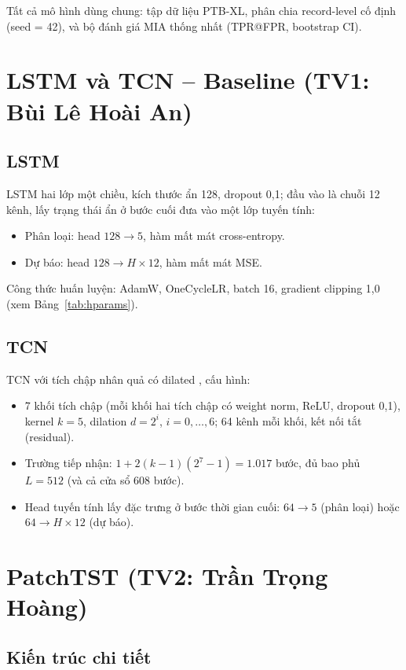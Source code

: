 \documentclass[12pt,a4paper]{report}
\begin{document}
Tất cả mô hình dùng chung: tập dữ liệu PTB-XL, phân chia record-level cố định (seed = 42), và bộ đánh giá MIA thống nhất (TPR@FPR, bootstrap CI).

\section{LSTM và TCN -- Baseline (TV1: Bùi Lê Hoài An)}

\subsection{LSTM}

LSTM hai lớp một chiều, kích thước ẩn 128, dropout 0,1; đầu vào là chuỗi 12 kênh, lấy trạng thái ẩn ở bước cuối đưa vào một lớp tuyến tính:
\begin{itemize}
  \item Phân loại: head $128 \to 5$, hàm mất mát cross-entropy.
  \item Dự báo: head $128 \to H \times 12$, hàm mất mát MSE.
\end{itemize}
Công thức huấn luyện: AdamW, OneCycleLR, batch 16, gradient clipping 1,0 (xem Bảng~\ref{tab:hparams}).

\subsection{TCN}

TCN với tích chập nhân quả có dilated \cite{bai2018tcn}, cấu hình:
\begin{itemize}
  \item 7 khối tích chập (mỗi khối hai tích chập có weight norm, ReLU, dropout 0,1), kernel $k = 5$, dilation $d = 2^i$, $i = 0, \ldots, 6$; 64 kênh mỗi khối, kết nối tắt (residual).
  \item Trường tiếp nhận: $1 + 2(k-1)(2^7 - 1) = 1.017$ bước, đủ bao phủ $L = 512$ (và cả cửa sổ 608 bước).
  \item Head tuyến tính lấy đặc trưng ở bước thời gian cuối: $64 \to 5$ (phân loại) hoặc $64 \to H \times 12$ (dự báo).
\end{itemize}

\section{PatchTST (TV2: Trần Trọng Hoàng)}

\subsection{Kiến trúc chi tiết}
\end{document}
